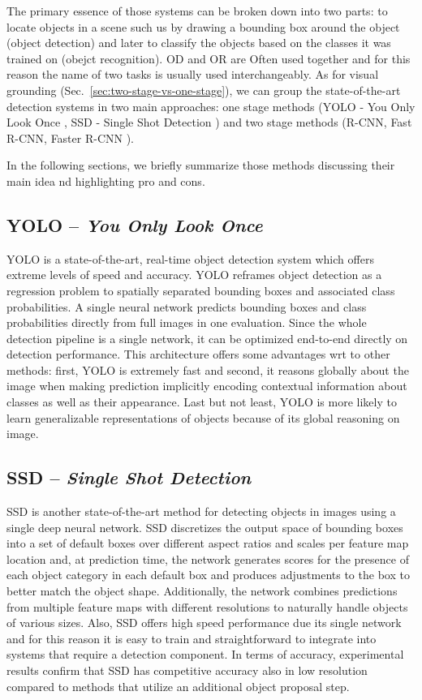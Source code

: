 The primary essence of those systems can be broken down into two
parts: to locate objects in a scene such us by drawing a bounding box
around the object (object detection) and later to classify the objects
based on the classes it was trained on (obejct recognition). OD and OR
are Often used together and for this reason the name of two tasks is
usually used interchangeably. As for visual grounding
(Sec.~\ref{sec:two-stage-vs-one-stage}), we can group the
state-of-the-art detection systems in two main approaches: one stage
methods (YOLO - You Only Look Once , SSD - Single
Shot Detection ) and two stage methods (R-CNN, Fast
R-CNN, Faster R-CNN ). 

In the following sections, we briefly summarize those methods
discussing their main idea nd highlighting pro and cons.

\subsection{YOLO -- \emph{You Only Look Once}}

YOLO is a state-of-the-art, real-time object detection system which
offers extreme levels of speed and accuracy. YOLO reframes object
detection as a regression problem to spatially separated bounding
boxes and associated class probabilities. A single neural network
predicts bounding boxes and class probabilities directly from full
images in one evaluation. Since the whole detection pipeline is a
single network, it can be optimized end-to-end directly on detection
performance. This architecture offers some advantages wrt to other
methods: first, YOLO is extremely fast and second, it reasons globally
about the image when making prediction implicitly encoding contextual
information about classes as well as their appearance. Last but not
least, YOLO is more likely to learn generalizable representations of
objects because of its global reasoning on image.

\subsection{SSD -- \emph{Single Shot Detection}}

SSD is another state-of-the-art method for detecting objects in images
using a single deep neural network. SSD discretizes the output space
of bounding boxes into a set of default boxes over different aspect
ratios and scales per feature map location and, at prediction time,
the network generates scores for the presence of each object category
in each default box and produces adjustments to the box to better
match the object shape. Additionally, the network combines predictions
from multiple feature maps with diﬀerent resolutions to naturally
handle objects of various sizes. Also, SSD offers high speed
performance due its single network and for this reason it is easy to
train and straightforward to integrate into systems that require a
detection component. In terms of accuracy, experimental results conﬁrm
that SSD has competitive accuracy also in low resolution compared to
methods that utilize an additional object proposal step.


